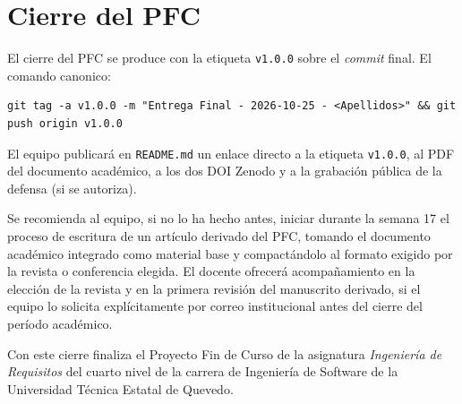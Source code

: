 \documentclass[11pt,a4paper]{article}
\begin{document}
\section{Cierre del PFC}

El cierre del PFC se produce con la etiqueta \texttt{v1.0.0} sobre el \emph{commit} final. El comando canonico:

\begin{lstlisting}
git tag -a v1.0.0 -m "Entrega Final - 2026-10-25 - <Apellidos>" && git push origin v1.0.0
\end{lstlisting}

El equipo publicar\'a en \texttt{README.md} un enlace directo a la etiqueta \texttt{v1.0.0}, al PDF del documento acad\'emico, a los dos DOI Zenodo y a la grabaci\'on p\'ublica de la defensa (si se autoriza).

Se recomienda al equipo, si no lo ha hecho antes, iniciar durante la semana 17 el proceso de escritura de un art\'iculo derivado del PFC, tomando el documento acad\'emico integrado como material base y compact\'andolo al formato exigido por la revista o conferencia elegida. El docente ofrecer\'a acompa\~namiento en la elecci\'on de la revista y en la primera revisi\'on del manuscrito derivado, si el equipo lo solicita expl\'icitamente por correo institucional antes del cierre del per\'iodo acad\'emico.

Con este cierre finaliza el Proyecto Fin de Curso de la asignatura \emph{Ingenier\'ia de Requisitos} del cuarto nivel de la carrera de Ingenier\'ia de Software de la Universidad T\'ecnica Estatal de Quevedo.



\end{document}
